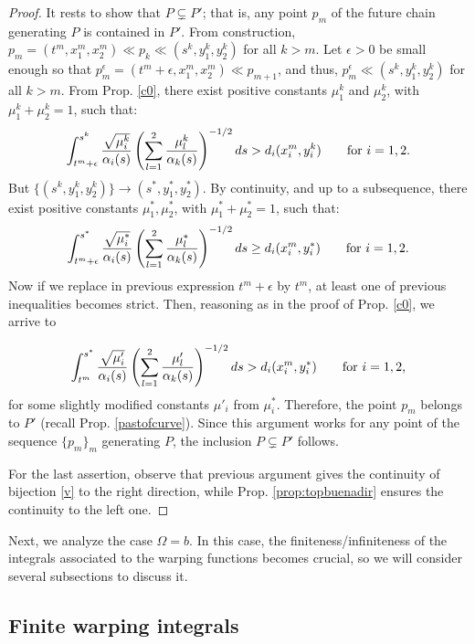 \begin{proof}
It rests to show that $P\subsetneq P'$; that is, any point $p_m$ of the future chain generating $P$ is contained in $P'$. From construction, $p_m=(t^m,x_1^m,x_2^m)\ll p_k \ll (s^k,y_1^k,y_2^k)$ for all $k> m$. Let $\epsilon>0$ be small enough so that $p_m^\epsilon=(t^m+\epsilon,x_1^m,x_2^m)\ll p_{m+1}$, and thus, $p_m^\epsilon\ll (s^k,y_1^k,y_2^k)$ for all $k>m$. From Prop. \ref{c0}, there exist positive constants $\mu_1^k$ and $\mu_2^k$, with $\mu_1^k+\mu_2^k=1$, such that:
\[
\int_{t^m+\epsilon}^{s^k} \frac{\sqrt{\mu^k_i}}{\alpha_{i}(s)}\left(\sum_{l=1}^{2} \frac{\mu^k_l}{\alpha_{k}(s)} \right)^{-1/2}ds>
d_{i}(x^{m}_{i},y^{k}_{i})\qquad\hbox{for $i=1,2$.}
  \]
 But $\{(s^k,y^k_1,y^k_2)\}\rightarrow (s^*,y_1^*,y_2^*)$. By continuity, and up to a subsequence, there exist positive constants $\mu_1^*,\mu_2^*$, with $\mu_1^*+\mu_2^*=1$, such that:
  \[
\int_{t^m+\epsilon}^{s^*} \frac{\sqrt{\mu^*_i}}{\alpha_{i}(s)}\left(\sum_{l=1}^{2} \frac{\mu^*_l}{\alpha_{k}(s)} \right)^{-1/2}ds \geq
d_{i}(x^{m}_{i},y^{*}_{i})\qquad\hbox{for $i=1,2$.}
    \]
    Now if we replace in previous expression $t^m+\epsilon$ by $t^m$, at least one of previous inequalities becomes strict. Then, reasoning as in the proof of Prop. \ref{c0}, we arrive to

      \[
\int_{t^m}^{s^*} \frac{\sqrt{\mu'_i}}{\alpha_{i}(s)}\left(\sum_{l=1}^{2} \frac{\mu'_l}{\alpha_{k}(s)} \right)^{-1/2}ds >
d_{i}(x^{m}_{i},y^{*}_{i})\qquad\hbox{for $i=1,2$,}
      \]
      for some slightly modified constants $\mu'_i$ from $\mu^*_i$. Therefore, the point $p_m$ belongs to $P'$ (recall Prop. \ref{pastofcurve}). Since this argument works for any point of the sequence $\{p_m\}_m$ generating $P$, the inclusion $P\subsetneq P'$ follows.

    \smallskip

For the last assertion, observe that previous argument gives the continuity of bijection \eqref{v} to the right direction, while Prop. \ref{prop:topbuenadir} ensures the continuity to the left one.

  \end{proof}

 Next, we analyze the case $\Omega=b$. In this case, the finiteness/infiniteness of the integrals associated to the warping functions becomes crucial, so we will consider several subsections to discuss it.

\subsection{Finite warping integrals}

